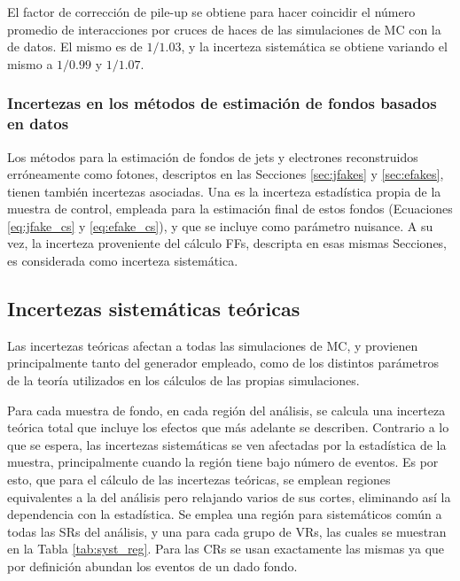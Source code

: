 El factor de corrección de pile-up se obtiene para hacer coincidir el número promedio de interacciones por cruces de haces de las simulaciones de MC con la de datos. El mismo es de $1/1.03$, y la incerteza sistemática se obtiene variando el mismo a $1/0.99$ y $1/1.07$. 

\subsubsection{Incertezas en los métodos de estimación de fondos basados en datos}

Los métodos para la estimación de fondos de jets y electrones reconstruidos erróneamente como fotones, descriptos en las Secciones \ref{sec:jfakes} y \ref{sec:efakes}, tienen también incertezas asociadas. Una es la incerteza estadística propia de la muestra de control, empleada para la estimación final de estos fondos (Ecuaciones \ref{eq:jfake_cs} y \ref{eq:efake_cs}), y que se incluye como parámetro nuisance. A su vez, la incerteza proveniente del cálculo FFs, descripta en esas mismas Secciones, es considerada como incerteza sistemática.


\subsection{Incertezas sistemáticas teóricas}

Las incertezas teóricas afectan a todas las simulaciones de MC, y provienen principalmente tanto del generador empleado, como de los distintos parámetros de la teoría utilizados en los cálculos de las propias simulaciones. 

Para cada muestra de fondo, en cada región del análisis, se calcula una incerteza teórica total que incluye los efectos que más adelante se describen. Contrario a lo que se espera, las incertezas sistemáticas se ven afectadas por la estadística de la muestra, principalmente cuando la región tiene bajo número de eventos. Es por esto, que para el cálculo de las incertezas teóricas, se emplean regiones equivalentes a la del análisis pero relajando varios de sus cortes, eliminando así la dependencia con la estadística. Se emplea una región para sistemáticos común a todas las SRs del análisis, y una para cada grupo de VRs, las cuales se muestran en la Tabla \ref{tab:syst_reg}. Para las CRs se usan exactamente las mismas ya que por definición abundan los eventos de un dado fondo.

